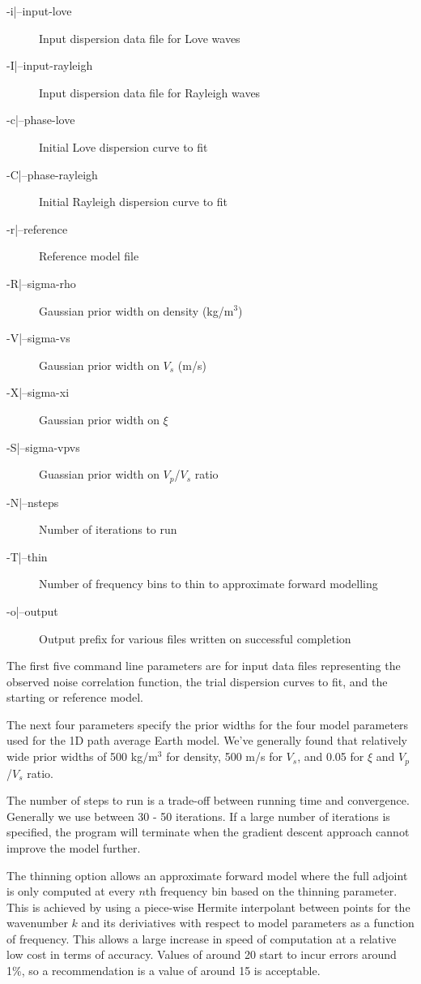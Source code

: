 \documentclass{article}
\begin{document}
\begin{description}
\item [-i|--input-love] Input dispersion data file for Love waves
\item [-I|--input-rayleigh] Input dispersion data file for Rayleigh waves
\item [-c|--phase-love] Initial Love dispersion curve to fit
\item [-C|--phase-rayleigh] Initial Rayleigh dispersion curve to fit
\item [-r|--reference] Reference model file
\item [-R|--sigma-rho] Gaussian prior width on density (kg/m$^3$)
\item [-V|--sigma-vs] Gaussian prior width on $V_s$ (m/s)
\item [-X|--sigma-xi] Gaussian prior width on $\xi$
\item [-S|--sigma-vpvs] Guassian prior width on $V_p$/$V_s$ ratio
\item [-N|--nsteps] Number of iterations to run
\item [-T|--thin] Number of frequency bins to thin to approximate forward modelling
\item [-o|--output] Output prefix for various files written on successful completion
\end{description}

The first five command line parameters are for input data files
representing the observed noise correlation function, the trial
dispersion curves to fit, and the starting or reference model.

The next four parameters specify the prior widths for the four model
parameters used for the 1D path average Earth model. We've generally
found that relatively wide prior widths of 500 kg/m$^3$ for density,
500 m/s for $V_s$, and 0.05 for $\xi$ and $V_p$/$V_s$ ratio.

The number of steps to run is a trade-off between running time and
convergence. Generally we use between 30 - 50 iterations. If a large
number of iterations is specified, the program will terminate when the
gradient descent approach cannot improve the model further.

The thinning option allows an approximate forward model where the full
adjoint is only computed at every $n$th frequency bin based on the
thinning parameter. This is achieved by using a piece-wise Hermite
interpolant between points for the wavenumber $k$ and its deriviatives
with respect to model parameters as a function of frequency.  This
allows a large increase in speed of computation at a relative low cost
in terms of accuracy. Values of around 20 start to incur errors around
1\%, so a recommendation is a value of around 15 is acceptable.
\end{document}
